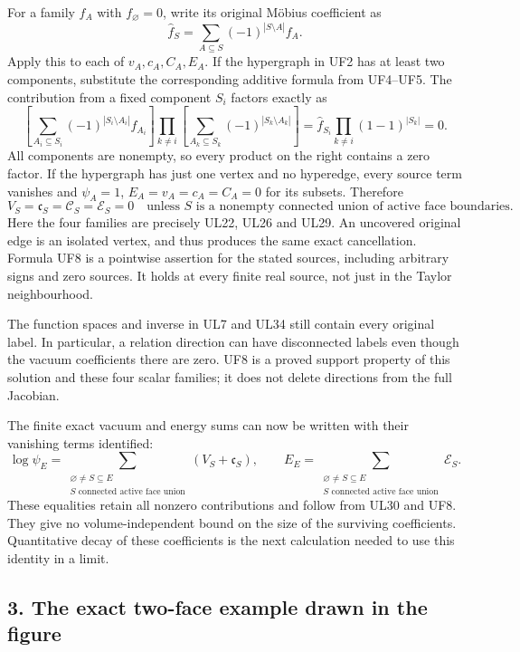 \documentclass[11pt]{article}
\begin{document}
For a family \(f_A\) with \(f_\varnothing=0\), write its original Möbius coefficient as
\[
\widehat f_S=\sum_{A\subseteq S}(-1)^{|S\setminus A|}f_A.
\tag{UF6}
\]
Apply this to each of \(v_A,c_A,C_A,E_A\). If the hypergraph in UF2 has at least two components, substitute the corresponding additive formula from UF4–UF5. The contribution from a fixed component \(S_i\) factors exactly as
\[
\left[\sum_{A_i\subseteq S_i}(-1)^{|S_i\setminus A_i|}f_{A_i}\right]
\prod_{k\ne i}\left[\sum_{A_k\subseteq S_k}(-1)^{|S_k\setminus A_k|}\right]
=\widehat f_{S_i}\prod_{k\ne i}(1-1)^{|S_k|}=0.
\tag{UF7}
\]
All components are nonempty, so every product on the right contains a zero factor. If the hypergraph has just one vertex and no hyperedge, every source term vanishes and \(\psi_A=1\), \(E_A=v_A=c_A=C_A=0\) for its subsets. Therefore
\[
\boxed{V_S=\mathfrak c_S=\mathcal C_S=\mathcal E_S=0
\quad\text{unless }S\text{ is a nonempty connected union of active face boundaries}.}
\tag{UF8}
\]
Here the four families are precisely UL22, UL26 and UL29. An uncovered original edge is an isolated vertex, and thus produces the same exact cancellation. Formula UF8 is a pointwise assertion for the stated sources, including arbitrary signs and zero sources. It holds at every finite real source, not just in the Taylor neighbourhood.

The function spaces and inverse in UL7 and UL34 still contain every original label. In particular, a relation direction can have disconnected labels even though the vacuum coefficients there are zero. UF8 is a proved support property of this solution and these four scalar families; it does not delete directions from the full Jacobian.

The finite exact vacuum and energy sums can now be written with their vanishing terms identified:
\[
\log\psi_E=\sum_{\substack{\varnothing\ne S\subseteq E\\
 S\text{ connected active face union}}}(V_S+\mathfrak c_S),
\qquad
E_E=\sum_{\substack{\varnothing\ne S\subseteq E\\
 S\text{ connected active face union}}}\mathcal E_S.
\tag{UF9}
\]
These equalities retain all nonzero contributions and follow from UL30 and UF8. They give no volume-independent bound on the size of the surviving coefficients. Quantitative decay of these coefficients is the next calculation needed to use this identity in a limit.

\subsection*{3. The exact two-face example drawn in the figure}
\end{document}

